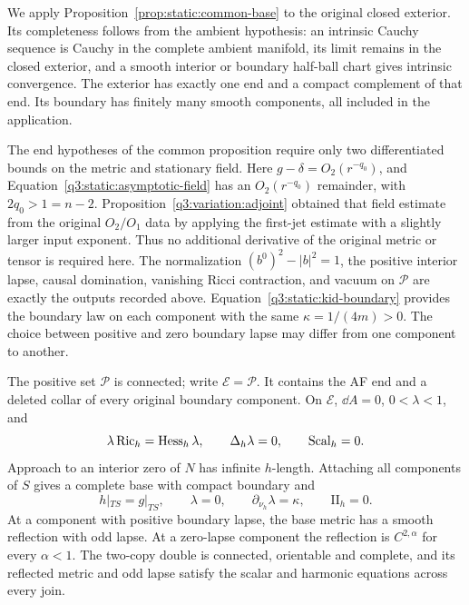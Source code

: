 We apply Proposition~\ref{prop:static:common-base} to the original
closed exterior. Its completeness follows from the ambient hypothesis:
an intrinsic Cauchy sequence is Cauchy in the complete ambient manifold,
its limit remains in the closed exterior, and a smooth interior or
boundary half-ball chart gives intrinsic convergence. The exterior
has exactly one end and a compact complement of that end. Its boundary
has finitely many smooth components, all included in the application.

The end hypotheses of the common proposition require only two
differentiated bounds on the metric and stationary field. Here
\(g-\delta=O_2(r^{-q_0})\), and
Equation~\eqref{q3:static:asymptotic-field} has an
\(O_2(r^{-q_0})\) remainder, with \(2q_0>1=n-2\).
Proposition~\ref{q3:variation:adjoint} obtained that field estimate
from the original \(O_2/O_1\) data by applying the first-jet estimate
with a slightly larger input exponent. Thus no additional derivative
of the original metric or tensor is required here. The normalization
\((b^0)^2-|b|^2=1\), the positive interior lapse, causal domination,
vanishing Ricci contraction, and vacuum on \(\mathcal P\) are exactly
the outputs recorded above. Equation~\eqref{q3:static:kid-boundary}
provides the boundary law on each component with the same
\(\kappa=1/(4m)>0\). The choice between positive and zero boundary
lapse may differ from one component to another.

\begin{lemma}
\label{q3:static:base-completion}
The positive set \(\mathcal P\) is connected; write
\(\mathcal E=\mathcal P\). It contains the AF end and a deleted collar
of every original boundary component. On \(\mathcal E\),
\(\dd A=0\), \(0<\lambda<1\), and
\begin{equation}
\label{q3:static:static-equations}
\lambda\operatorname{Ric}_h=\operatorname{Hess}_h\lambda,\qquad
\Delta_h\lambda=0,\qquad \operatorname{Scal}_h=0.
\end{equation}
Approach to an interior zero of \(N\) has infinite \(h\)-length.
Attaching all components of \(S\) gives a complete base with compact
boundary and
\begin{equation}
\label{q3:static:base-boundary-data}
h|_{TS}=g|_{TS},\qquad
\lambda=0,\qquad
\partial_{\nu_h}\lambda=\kappa,\qquad
\mathrm{II}_h=0.
\end{equation}
At a component with positive boundary lapse, the base metric has a
smooth reflection with odd lapse. At a zero-lapse component the
reflection is \(C^{2,\alpha}\) for every \(\alpha<1\).
The two-copy double is connected, orientable and complete, and its
reflected metric and odd lapse satisfy the scalar and harmonic
equations across every join.
\end{lemma}

